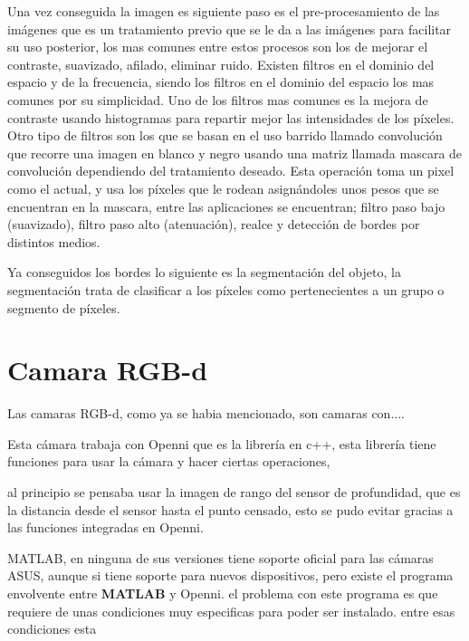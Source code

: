     Una vez conseguida la imagen es siguiente paso es el pre-procesamiento de las imágenes que es un tratamiento previo que se le da a las imágenes para facilitar su uso posterior, los mas comunes entre estos procesos son los de mejorar el contraste, suavizado, afilado, eliminar ruido. Existen filtros en el dominio del espacio y de la frecuencia, siendo los filtros en el dominio del espacio los mas comunes por su simplicidad. Uno de los filtros mas comunes es la mejora de contraste usando histogramas para repartir mejor las intensidades de los píxeles. Otro tipo de filtros son los que se basan en el uso barrido llamado convolución que recorre una imagen en blanco y negro usando una matriz llamada mascara de convolución dependiendo del tratamiento deseado. Esta operación toma un pixel como el actual, y usa los píxeles que le rodean asignándoles unos pesos que se encuentran en la mascara, entre las aplicaciones se encuentran; filtro paso bajo (suavizado), filtro paso alto (atenuación), realce y detección de bordes por distintos medios.
    
    Ya conseguidos los bordes lo siguiente es la segmentación del objeto, la segmentación trata de clasificar a los píxeles como pertenecientes a un grupo o segmento de píxeles.
    
    \section{Camara RGB-d}
    
    Las camaras RGB-d, como ya se habia mencionado, son camaras con....
    
    
    Esta cámara trabaja con Openni que es la librería en c++, esta librería tiene funciones para usar la cámara y hacer ciertas operaciones, 
    
    al principio se pensaba usar la imagen de rango del sensor de profundidad, que es la distancia desde el sensor hasta el punto censado, esto se pudo evitar gracias a las funciones integradas en Openni.
    
    MATLAB, en ninguna de sus versiones tiene soporte oficial para las cámaras ASUS, aunque si tiene soporte para nuevos dispositivos, pero existe el programa envolvente entre \textbf{MATLAB} y Openni.
    el problema con este programa es que requiere de unas condiciones muy especificas para poder ser instalado. entre esas condiciones esta
    
